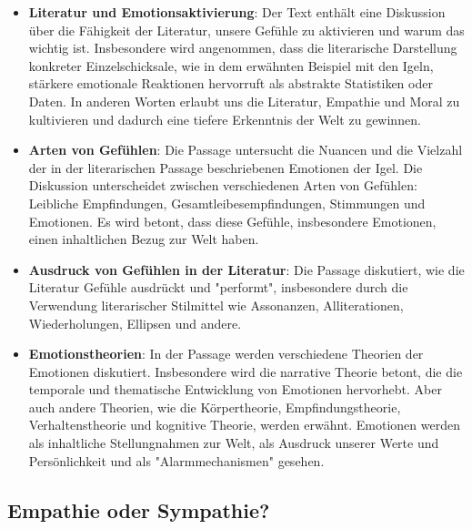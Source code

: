 \documentclass{article}
\begin{document}
\begin{itemize}

	\item \textbf{Literatur und Emotionsaktivierung}: Der Text enthält eine Diskussion über die Fähigkeit der Literatur, unsere Gefühle zu aktivieren und warum das wichtig ist. Insbesondere wird angenommen, dass die literarische Darstellung konkreter Einzelschicksale, wie in dem erwähnten Beispiel mit den Igeln, stärkere emotionale Reaktionen hervorruft als abstrakte Statistiken oder Daten. In anderen Worten erlaubt uns die Literatur, Empathie und Moral zu kultivieren und dadurch eine tiefere Erkenntnis der Welt zu gewinnen.

	\item \textbf{Arten von Gefühlen}: Die Passage untersucht die Nuancen und die Vielzahl der in der literarischen Passage beschriebenen Emotionen der Igel. Die Diskussion unterscheidet zwischen verschiedenen Arten von Gefühlen: Leibliche Empfindungen, Gesamtleibesempfindungen, Stimmungen und Emotionen. Es wird betont, dass diese Gefühle, insbesondere Emotionen, einen inhaltlichen Bezug zur Welt haben.

	\item \textbf{Ausdruck von Gefühlen in der Literatur}: Die Passage diskutiert, wie die Literatur Gefühle ausdrückt und "performt", insbesondere durch die Verwendung literarischer Stilmittel wie Assonanzen, Alliterationen, Wiederholungen, Ellipsen und andere.

	\item \textbf{Emotionstheorien}: In der Passage werden verschiedene Theorien der Emotionen diskutiert. Insbesondere wird die narrative Theorie betont, die die temporale und thematische Entwicklung von Emotionen hervorhebt. Aber auch andere Theorien, wie die Körpertheorie, Empfindungstheorie, Verhaltenstheorie und kognitive Theorie, werden erwähnt. Emotionen werden als inhaltliche Stellungnahmen zur Welt, als Ausdruck unserer Werte und Persönlichkeit und als "Alarmmechanismen" gesehen.

\end{itemize}

\subsection{Empathie oder Sympathie?}
\end{document}
